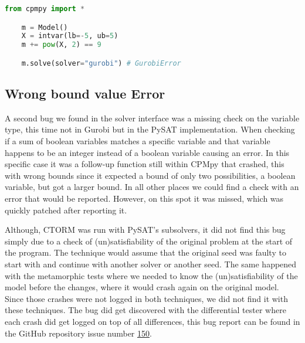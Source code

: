 \begin{lstlisting}[language=python, label={lst:Bug:PowGurobi}, caption={The “power function of Gurobi”-bug.}]
	from cpmpy import *

	m = Model()
	X = intvar(lb=-5, ub=5)
	m += pow(X, 2) == 9

	m.solve(solver="gurobi") # GurobiError
\end{lstlisting}



\subsection{Wrong bound value Error}
\label{res:bug:WrongBounds}
A second bug we found in the solver interface was a missing check on the variable type, this time not in Gurobi but in the PySAT implementation. When checking if a sum of boolean variables matches a specific variable and that variable happens to be an integer instead of a boolean variable causing an error. In this specific case it was a follow-up function still within CPMpy that crashed, this with wrong bounds since it expected a bound of only two possibilities, a boolean variable, but got a larger bound. In all other places we could find a check with an error that would be reported. However, on this spot it was missed, which was quickly patched after reporting it.

Although, CTORM was run with PySAT’s subsolvers, it did not find this bug simply due to a check of (un)satisfiability of the original problem at the start of the program. The technique would assume that the original seed was faulty to start with and continue with another solver or another seed. The same happened with the metamorphic tests where we needed to know the (un)satisfiability of the model before the changes, where it would crash again on the original model. Since those crashes were not logged in both techniques, we did not find it with these techniques. The bug did get discovered with the differential tester where each crash did get logged on top of all differences, this bug report can be found in the GitHub repository issue number \href{https://github.com/CPMpy/cpmpy/issues/150}{150}.

%
%

